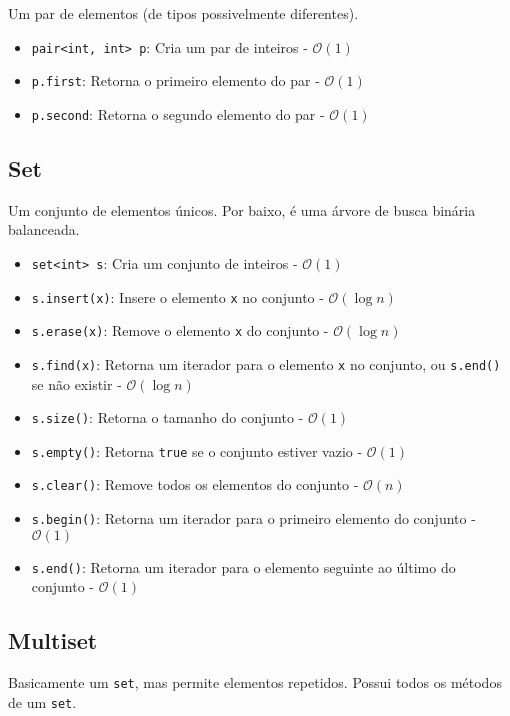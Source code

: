 Um par de elementos (de tipos possivelmente diferentes).

\begin{itemize}
    \item \texttt{pair<int, int> p}: Cria um par de inteiros - $\mathcal{O}(1)$
    \item \texttt{p.first}: Retorna o primeiro elemento do par - $\mathcal{O}(1)$
    \item \texttt{p.second}: Retorna o segundo elemento do par - $\mathcal{O}(1)$
\end{itemize}

\subsection{Set}

Um conjunto de elementos únicos. Por baixo, é uma árvore de busca binária balanceada.

\begin{itemize}
    \item \texttt{set<int> s}: Cria um conjunto de inteiros - $\mathcal{O}(1)$
    \item \texttt{s.insert(x)}: Insere o elemento \texttt{x} no conjunto - $\mathcal{O}(\log n)$
    \item \texttt{s.erase(x)}: Remove o elemento \texttt{x} do conjunto - $\mathcal{O}(\log n)$
    \item \texttt{s.find(x)}: Retorna um iterador para o elemento \texttt{x} no conjunto, ou \texttt{s.end()} se não existir - $\mathcal{O}(\log n)$
    \item \texttt{s.size()}: Retorna o tamanho do conjunto - $\mathcal{O}(1)$
    \item \texttt{s.empty()}: Retorna \texttt{true} se o conjunto estiver vazio - $\mathcal{O}(1)$
    \item \texttt{s.clear()}: Remove todos os elementos do conjunto - $\mathcal{O}(n)$
    \item \texttt{s.begin()}: Retorna um iterador para o primeiro elemento do conjunto - $\mathcal{O}(1)$
    \item \texttt{s.end()}: Retorna um iterador para o elemento seguinte ao último do conjunto - $\mathcal{O}(1)$
\end{itemize}

\subsection{Multiset}

Basicamente um \texttt{set}, mas permite elementos repetidos. Possui todos os métodos de um \texttt{set}.

